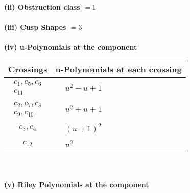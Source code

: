 \documentclass[1p]{elsarticle_modified}
\theoremstyle{definition}
\begin{document}
\flushleft \textbf{(ii) Obstruction class $= 1$}\\~\\
\flushleft \textbf{(iii) Cusp Shapes $= 3$}\\~\\
\newpage\renewcommand{\arraystretch}{1}
\flushleft \textbf{(iv) u-Polynomials at the component}\newline \\
\begin{tabular}{m{50pt}|m{274pt}}
Crossings & \hspace{64pt}u-Polynomials at each crossing \\
\hline $$\begin{aligned}c_{1},c_{5},c_{6}\\c_{11}\end{aligned}$$&$\begin{aligned}
&u^2- u+1
\end{aligned}$\\
\hline $$\begin{aligned}c_{2},c_{7},c_{8}\\c_{9},c_{10}\end{aligned}$$&$\begin{aligned}
&u^2+u+1
\end{aligned}$\\
\hline $$\begin{aligned}c_{3},c_{4}\end{aligned}$$&$\begin{aligned}
&(u+1)^2
\end{aligned}$\\
\hline $$\begin{aligned}c_{12}\end{aligned}$$&$\begin{aligned}
&u^2
\end{aligned}$\\
\hline
\end{tabular}\\~\\
\newpage\renewcommand{\arraystretch}{1}
\flushleft \textbf{(v) Riley Polynomials at the component}\newline \\
\end{document}
